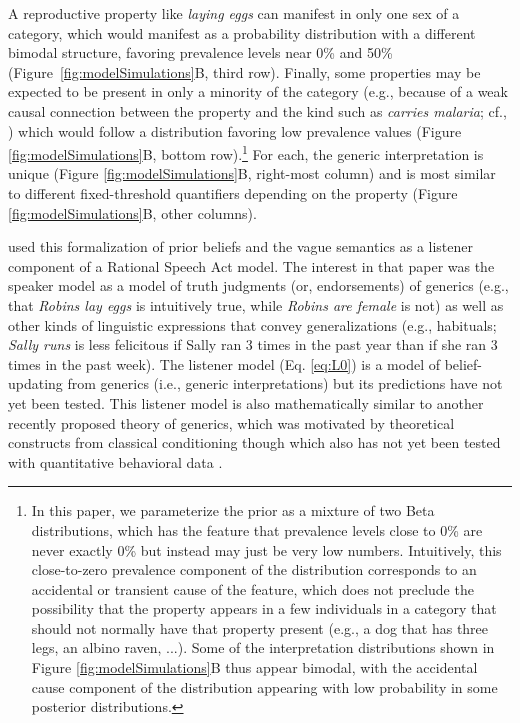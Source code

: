 \documentclass[floatsintext,doc]{apa6}
\let\rmarkdownfootnote\footnote%
\def\footnote{\protect\rmarkdownfootnote}
\begin{document}
A reproductive property like \emph{laying eggs} can manifest in only one sex of a category, which would manifest as a probability distribution with a different bimodal structure, favoring prevalence levels near 0\% and 50\% (Figure~\ref{fig:modelSimulations}B, third row).  
Finally, some properties may be expected to be present in only a minority of the category (e.g., because of a weak causal connection between the property and the kind such as \emph{carries malaria}; cf., ) which would follow a distribution  favoring low prevalence values (Figure \ref{fig:modelSimulations}B, bottom row).\footnote{
In this paper, we parameterize the prior as a mixture of two Beta distributions, which has the feature that prevalence levels close to 0\% are never exactly 0\% but instead may just be very low numbers. Intuitively, this close-to-zero prevalence component of the distribution corresponds to an accidental or transient cause of the feature, which does not preclude the possibility that the property appears in a few individuals in a category that should not normally have that property present (e.g., a dog that has three legs, an albino raven, ...).
Some of the interpretation distributions shown in Figure \ref{fig:modelSimulations}B thus appear bimodal, with the accidental cause component of the distribution appearing with low probability in some posterior distributions.%
}
For each, the generic interpretation is unique (Figure \ref{fig:modelSimulations}B, right-most column) and is most similar to different fixed-threshold quantifiers depending on the property (Figure \ref{fig:modelSimulations}B, other columns).

 used this formalization of prior beliefs and the vague semantics as a listener component of a Rational Speech Act model. The interest in that paper was the speaker model as a model of truth judgments (or, endorsements) of generics (e.g., that \emph{Robins lay eggs} is intuitively true, while \emph{Robins are female} is not) as well as other kinds of linguistic expressions that convey generalizations (e.g., habituals;  \emph{Sally runs} is less felicitous if Sally ran 3 times in the past year than if she ran 3 times in the past week).
The listener model (Eq. \ref{eq:L0}) is a model of belief-updating from generics (i.e., generic interpretations) but its predictions have not yet been tested.
This listener model is also mathematically similar to another recently proposed theory of generics, which was motivated by theoretical constructs from classical conditioning though which also has not yet been tested with quantitative behavioral data \cite{vanRooij2020generics}.
\end{document}
